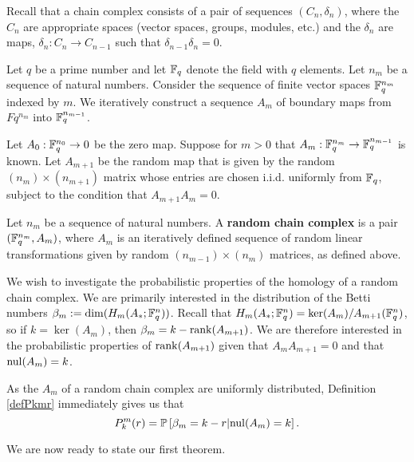 Recall that a chain complex consists of a pair of sequences $(C_n, \delta_n)$, where the $C_n$ are appropriate spaces (vector spaces, groups, modules, etc.) and the $\delta_n$ are maps, $\delta_n: C_n \to C_{n-1}$ such that $\delta_{n-1}\delta_n = 0$.  

Let $q$ be a prime number and let $\mathbb{F}_q$ denote the field with $q$ elements. Let $n_m$ be a sequence of natural numbers. Consider the sequence of finite vector spaces $\mathbb{F}_q^{n_m}$ indexed by $m$.  We iteratively construct a sequence $A_m$ of boundary maps from $Fq^{n_m}$ into $\mathbb{F}_q^{n_{m-1}}$.

Let $A_0:\mathbb{F}_q^{n_0} \to 0$ be the zero map. Suppose for $m>0$ that $A_{m}:\mathbb{F}_q^{n_m} \to \mathbb{F}_q^{n_{m-1}}$ is known. Let $A_{m+1}$ be the random map that is given by the random $(n_{m})\times (n_{m+1})$ matrix whose entries are chosen i.i.d. uniformly from $\mathbb{F}_q$, subject to the condition that $A_{m+1}A_{m} = 0$.

\begin{definition}
Let $n_m$ be a sequence of natural numbers. A \textbf{random chain complex} is a pair $(\mathbb{F}_q^{n_m},A_m)$, where $A_m$ is an iteratively defined sequence of random linear transformations given by random $(n_{m-1})\times (n_m)$ matrices, as defined above.
\end{definition}

We wish to investigate the probabilistic properties of the homology of a random chain complex.  We are primarily interested in the distribution of the Betti numbers $\beta_m := \dim(H_m(A_\ast; \mathbb{F}_q^{n}))$.  Recall that $H_m(A_\ast;\mathbb{F}_q^{n}) = \ker (A_{m})/ A_{m+1}(\mathbb{F}_q^{n})$, so if $k= \ker(A_m)$, then $\beta_m = k - \operatorname{\mathrm{rank}}(A_{m+1})$.  We are therefore interested in the probabilistic properties of $\operatorname{\mathrm{rank}}(A_{m+1})$ given that $A_{m}A_{m+1} = 0$ and that $\mathrm{nul}(A_{m}) = k$. 


\begin{remark}
As the $A_m$ of a random chain complex are uniformly distributed, Definition \ref{defPkmr} immediately gives us that
\[
P^m_k(r) = \mathbb{P}\left[\beta_m = k-r | \mathrm{nul}(A_{m}) = k\right].
\]
\end{remark}

We are now ready to state our first theorem. 



